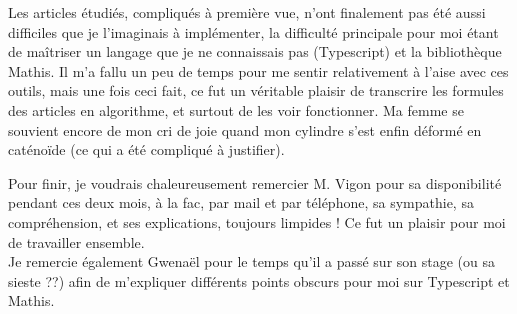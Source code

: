 \documentclass {report}
\begin{document}
Les articles étudiés, compliqués à première vue, n'ont finalement pas été aussi difficiles que je l'imaginais à implémenter, la difficulté principale pour moi étant de maîtriser un langage que je ne connaissais pas (Typescript) et la bibliothèque Mathis. Il m'a fallu un peu de temps pour me sentir relativement à l'aise avec ces outils, mais une fois ceci fait, ce fut un véritable plaisir de transcrire les formules des articles en algorithme, et surtout de les voir fonctionner. Ma femme se souvient encore de mon cri de joie quand mon cylindre s'est enfin déformé en caténoïde (ce qui a été compliqué à justifier).

Pour finir, je voudrais chaleureusement remercier M. Vigon pour sa disponibilité pendant ces deux mois, à la fac, par mail et par téléphone, sa sympathie, sa compréhension, et ses explications, toujours limpides ! Ce fut un plaisir pour moi de travailler ensemble.\\
Je remercie également Gwenaël pour le temps qu'il a passé sur son stage (ou sa sieste ??) afin de m'expliquer différents points obscurs pour moi sur Typescript et Mathis. 



\nocite{*}



\end{document}
